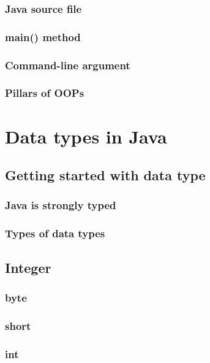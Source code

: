 \documentclass[14pt,fleqn]{extbook} %
\begin{document}
\subsection{Java source file}
 
\subsection{main() method}
 
\subsection{Command-line argument}
 
\subsection{Pillars of OOPs}



\chapter{Data types in Java}
\section{Getting started with data type}

\subsection{Java is strongly typed}

\subsection{Types of data types}

\section{Integer}

\subsection{byte}

\subsection{short}

\subsection{int}

\end{document}

